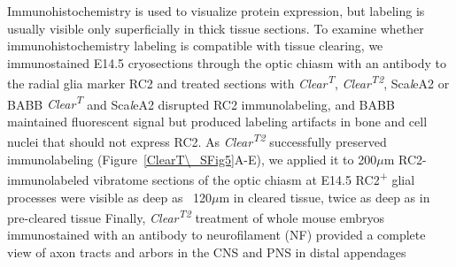 Immunohistochemistry is used to visualize protein expression, but labeling is usually visible only superficially in thick tissue sections.
To examine whether immunohistochemistry labeling is compatible with tissue clearing, we immunostained E14.5 cryosections through the optic chiasm with an antibody to the radial glia marker RC2 and treated sections with \emph{Clear\textsuperscript{T}}, \emph{Clear\textsuperscript{T2}}, Sca\emph{l}eA2 or BABB %
\emph{Clear\textsuperscript{T}} and Sca\emph{l}eA2 disrupted RC2 immunolabeling, and BABB maintained fluorescent signal but produced labeling artifacts in bone and cell nuclei that should not express RC2.
As \emph{Clear\textsuperscript{T2}} successfully preserved immunolabeling (Figure~\ref{ClearT\_SFig5}A-E), we applied it to 200$\mu$m RC2-immunolabeled vibratome sections of the optic chiasm at E14.5 %
RC2\textsuperscript{+} glial processes were visible as deep as ~120$\mu$m in cleared tissue, twice as deep as in pre-cleared tissue %
Finally, \emph{Clear\textsuperscript{T2}} treatment of whole mouse embryos immunostained with an antibody to neurofilament (NF) provided a complete view of axon tracts and arbors in the CNS and PNS in distal appendages %
